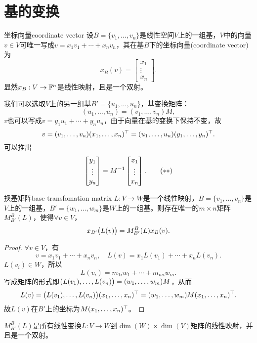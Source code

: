 \section{基的变换}
\begin{definition}{坐标向量}{coordinate vector}
	设$B=\{v_1,\ldots,v_n\}$是线性空间$V$上的一组基，$V$中的向量$v\in V$可唯一写成$v=x_1v_1+\cdots+x_nv_n$，其在基$B$下的坐标向量(coordinate vector)为
	\[
		x_B(v)=\begin{bmatrix}
			x_1\\\vdots\\x_n
		\end{bmatrix}.
	\]
	显然$x_B:V\to\mathbb F^n$是线性映射，且是一个双射。
\end{definition}
我们可以选取$V$上的另一组基$B'=\{u_1,\ldots,u_n\}$，基变换矩阵：
\[
	(u_1,\ldots,u_n)=(v_1,\ldots,v_n)M,\tag{$\ast$}
\]
$v$也可以写成$v=y_1u_1+\cdots+y_nu_n$，由于向量在基的变换下保持不变，故
\[
	v=(v_1,\ldots,v_n)(x_1,\ldots,x_n)^\top=(u_1,\ldots,u_n)(y_1,\ldots,y_n)^\top.
\]
可以推出
\[
	\begin{bmatrix}
		y_1\\\vdots\\y_n
	\end{bmatrix}=M^{-1}\begin{bmatrix}
		x_1\\\vdots\\x_n
	\end{bmatrix}.\tag{$\ast\ast$}
\]
\begin{theorem}{换基矩阵}{base transfomation matrix}
	$L:V\to W$是一个线性映射，$B=\{v_1,\ldots,v_n\}$是$V$上的一组基，$B'=\{w_1,\ldots,w_m\}$是$W$上的一组基。则存在唯一的$m\times n$矩阵$M_{B'}^B(L)$，使得$\forall v\in V$，
	\[
		x_{B'}\bigl(L(v)\bigr)=M_{B'}^B(L)x_B(v).
	\]
\end{theorem}
\begin{proof}
	$\forall v\in V$，有
	\[
		v=x_1v_1+\cdots+x_nv_n,\quad L(v)=x_1L(v_1)+\cdots+x_nL(v_n).
	\]
	$L(v_i)\in W$，所以
	\[
		L(v_i)=m_{1i}w_1+\cdots+m_{mi}w_m.
	\]
	写成矩阵的形式即$\bigl(L(v_1),\ldots,L(v_n)\bigr)=(w_1,\ldots,w_m)M$，从而
	\[
		L(v)=\bigl(L(v_1),\ldots,L(v_n)\bigr)(x_1,\ldots,x_n)^\top=(w_1,\ldots,w_m)M(x_1,\ldots,x_n)^\top.
	\]
	故$L(v)$在$B'$上的坐标为$M(x_1,\ldots,x_n)^\top$。
\end{proof}

$M_{B'}^B(L)$是所有线性变换$L:V\to W$到$\dim(W)\times\dim(V)$矩阵的线性映射，并且是一个双射。


